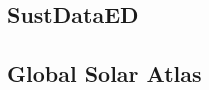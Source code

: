 \subsection{SustDataED}
\cite{sustdata}









\subsection{Global Solar Atlas}
































